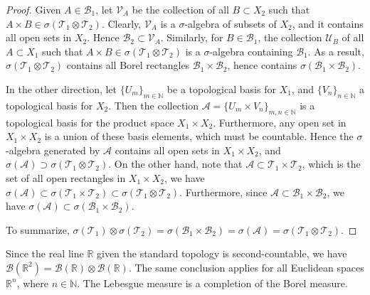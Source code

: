 \documentclass{article}
\numberwithin{equation}{section}
\newcommand{\bbN}{\mathbb{N}}
\newcommand{\bbR}{\mathbb{R}}
\theoremstyle{plain}
\theoremstyle{definition}
\begin{document}
\begin{proof}
Given $A\in\mathscr{B}_1$, let $\mathscr{V}_A$ be the collection of all $B\subset X_2$ such that $A\times B\in\sigma(\mathscr{T}_1\otimes\mathscr{T}_2)$. Clearly, $\mathscr{V}_A$ is a $\sigma$-algebra of subsets of $X_2$, and it contains all open sets in $X_2$. Hence $\mathscr{B}_2\subset\mathscr{V}_A$. Similarly, for $B\in\mathscr{B}_1$, the collection $\mathscr{U}_B$ of all $A\subset X_1$ such that $A\times B\in\sigma(\mathscr{T}_1\otimes\mathscr{T}_2)$ is a $\sigma$-algebra containing $\mathscr{B}_1$. As a result, $\sigma(\mathscr{T}_1\otimes\mathscr{T}_2)$ contains all Borel rectangles $\mathscr{B}_1\times\mathscr{B}_2$, hence contains $\sigma(\mathscr{B}_1\times\mathscr{B}_2)$. 

In the other direction, let $\{U_m\}_{m\in\mathbb{N}}$ be a topological basis for $X_1$, and $\{V_n\}_{n\in\mathbb{N}}$ a topological basis for $X_2$. Then the collection $\mathscr{A}=\{U_m\times V_n\}_{m,n\in\mathbb{N}}$ is a topological basis for the product space $X_1\times X_2$. Furthermore, any open set in $X_1\times X_2$ is a union of these basis elements, which must be countable. Hence the $\sigma$-algebra generated by $\mathscr{A}$ contains all open sets in $X_1\times X_2$, and $\sigma(\mathscr{A})\supset\sigma(\mathscr{T}_1\otimes\mathscr{T}_2)$. On the other hand, note that $\mathscr{A}\subset\mathscr{T}_1\times\mathscr{T}_2$, which is the set of all open rectangles in $X_1\times X_2$, we have $\sigma(\mathscr{A})\subset\sigma(\mathscr{T}_1\times\mathscr{T}_2)\subset\sigma(\mathscr{T}_1\otimes\mathscr{T}_2)$. Furthermore, since $\mathscr{A}\subset\mathscr{B}_1\times\mathscr{B}_2$, we have $\sigma(\mathscr{A})\subset\sigma(\mathscr{B}_1\times\mathscr{B}_2)$.

To summarize, $\sigma(\mathscr{T}_1)\otimes\sigma(\mathscr{T}_2)=\sigma(\mathscr{B}_1\times\mathscr{B}_2)=\sigma(\mathscr{A})=\sigma(\mathscr{T}_1\otimes\mathscr{T}_2)$.
\end{proof}

Since the real line $\mathbb{R}$ given the standard topology is second-countable, we have $\mathscr{B}(\mathbb{R}^2)=\mathscr{B}(\mathbb{R})\otimes\mathscr{B}(\mathbb{R})$. The same conclusion applies for all Euclidean spaces $\bbR^n$, where $n\in\bbN$. The Lebesgue measure is a completion of the Borel measure.
\end{document}
